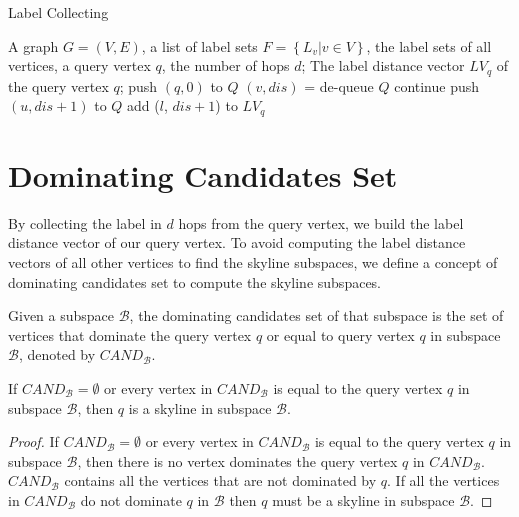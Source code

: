 \begin{algorithm}[H]
  \caption{Label Collecting}\label{algo:blah}
  \begin{algorithmic}[1]
  \show\LOOP
    \REQUIRE A graph $G=(V,E)$, a list of label sets $F=\left\{L_v | v \in V\right\}$, the label sets of all vertices, a query vertex $q$, the number of hops $d$;
    \ENSURE The label distance vector $LV_q$ of the query vertex $q$;
    \STATE push $\left(q, 0\right)$ to $Q$
        \STATE $\left( v, dis\right)$ = de-queue $Q$
            \STATE continue
        \ENDIF
            \STATE push $\left(u, dis+1\right)$ to $Q$
                    \STATE add ($l$, $dis+1$) to $LV_q$
                \ENDIF
            \ENDFOR
        \ENDFOR
    \ENDWHILE
  \end{algorithmic}
\end{algorithm}

\section{Dominating Candidates Set}
\label{sec:bfs-collect}

By collecting the label in $d$ hops from the query vertex, we build the label distance vector of our query vertex. To avoid computing the label distance vectors of all other vertices to find the skyline subspaces, we define a concept of dominating candidates set to compute the skyline subspaces.

\begin{definition}
Given a subspace $\mathcal{B}$, the dominating candidates set of that subspace is the set of vertices that dominate the query vertex $q$ or equal to query vertex $q$ in subspace $\mathcal{B}$, denoted by $\mathit{CAND}_\mathcal{B}$.
\end{definition}

\begin{property}
\label{ppt:empty_cand}
If $\mathit{CAND}_\mathcal{B} = \emptyset$ or every vertex in $\mathit{CAND}_\mathcal{B}$ is equal to the query vertex $q$ in subspace $\mathcal{B}$, then $q$ is a skyline in subspace $\mathcal{B}$.
\end{property}

\begin{proof}
If $\mathit{CAND}_\mathcal{B} = \emptyset$ or every vertex in $\mathit{CAND}_\mathcal{B}$ is equal to the query vertex $q$ in subspace $\mathcal{B}$, then there is no vertex dominates the query vertex $q$ in $\mathit{CAND}_\mathcal{B}$.
$\mathit{CAND}_\mathcal{B}$ contains all the vertices that are not dominated by $q$. If all the vertices in $\mathit{CAND}_\mathcal{B}$ do not dominate $q$ in $\mathcal{B}$ then $q$ must be a skyline in subspace $\mathcal{B}$.
\end{proof}

